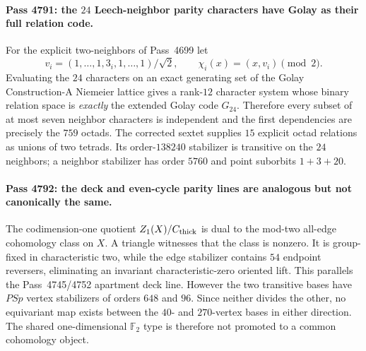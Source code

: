 \paragraph{Pass 4791: the $24$ Leech-neighbor parity characters have Golay as their full relation code.}
For the explicit two-neighbors of Pass~4699 let
\[
v_i=(1,\ldots,1,3_i,1,\ldots,1)/\sqrt2,
\qquad \chi_i(x)=(x,v_i)\pmod2.
\]
Evaluating the $24$ characters on an exact generating set of the Golay Construction-A Niemeier lattice gives a rank-$12$ character system whose binary relation space is \emph{exactly} the extended Golay code $G_{24}$.  Therefore every subset of at most seven neighbor characters is independent and the first dependencies are precisely the $759$ octads.  The corrected sextet supplies $15$ explicit octad relations as unions of two tetrads.  Its order-$138240$ stabilizer is transitive on the $24$ neighbors; a neighbor stabilizer has order $5760$ and point suborbits $1+3+20$.

\paragraph{Pass 4792: the deck and even-cycle parity lines are analogous but not canonically the same.}
The codimension-one quotient $Z_1(X)/C_{\rm thick}$ is dual to the mod-two all-edge cohomology class on $X$.  A triangle witnesses that the class is nonzero.  It is group-fixed in characteristic two, while the edge stabilizer contains $54$ endpoint reversers, eliminating an invariant characteristic-zero oriented lift.  This parallels the Pass~4745/4752 apartment deck line.  However the two transitive bases have $PSp$ vertex stabilizers of orders $648$ and $96$.  Since neither divides the other, no equivariant map exists between the $40$- and $270$-vertex bases in either direction.  The shared one-dimensional $\mathbb F_2$ type is therefore not promoted to a common cohomology object.

\begin{center}
\end{center}
